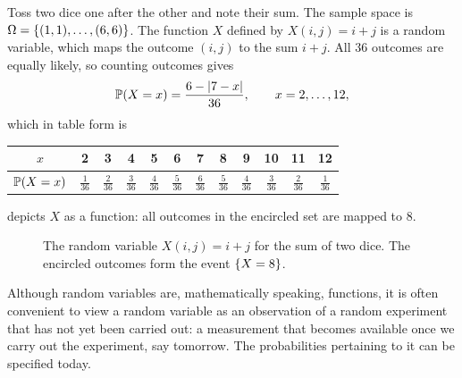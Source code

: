 \begin{example}\label{ex:sum-two-dice}
Toss two dice one after the other and note their sum. The sample space is $\Omega = \left\{ (1,1), \ldots, (6,6) \right\}$. The function $X$ defined by $X(i, j) = i + j$ is a random variable, which maps the outcome $(i,j)$ to the sum $i + j$. All 36 outcomes are equally likely, so counting outcomes gives
\[
  \mathbb{P}(X = x) = \frac{6 - \lvert7 - x\rvert}{36}, \qquad x = 2, \ldots, 12,
\]
which in table form is
\begin{center}
\renewcommand{\arraystretch}{1.25}
\begin{tabular}{c|ccccccccccc}
$x$ & 2 & 3 & 4 & 5 & 6 & 7 & 8 & 9 & 10 & 11 & 12 \\
\hline
$\mathbb{P}(X = x)$ & $\frac{1}{36}$ & $\frac{2}{36}$ & $\frac{3}{36}$ & $\frac{4}{36}$ & $\frac{5}{36}$ & $\frac{6}{36}$ & $\frac{5}{36}$ & $\frac{4}{36}$ & $\frac{3}{36}$ & $\frac{2}{36}$ & $\frac{1}{36}$ \\
\end{tabular}
\end{center}
 depicts $X$ as a function: all outcomes in the encircled set are mapped to 8.
\end{example}

\begin{figure}[H]
\centering
{}
\caption{The random variable $X(i,j) = i + j$ for the sum of two dice. The encircled outcomes form the event $\left\{ X = 8 \right\}$.}
\label{fig:rv-sum-two-dice}
\end{figure}

Although random variables are, mathematically speaking, functions, it is often convenient to view a random variable as an observation of a random experiment that has not yet been carried out: a measurement that becomes available once we carry out the experiment, say tomorrow. The probabilities pertaining to it can be specified today.

